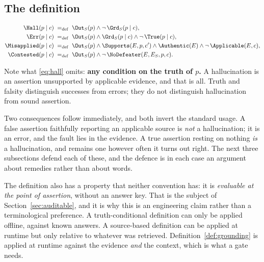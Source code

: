 \subsection{The definition}
\label{sec:hall-def}

\begin{definition}
\label{def:hallucination}
\begin{align}
  \Hall(p \mid c)       &\;=_{\mathrm{def}}\; \Out_S(p) \wedge \neg\,\Grd_S(p \mid c), \label{eq:hall}\\
  \Err(p \mid c)        &\;=_{\mathrm{def}}\; \Out_S(p) \wedge \Grd_S(p \mid c)
                           \wedge \neg\,\True(p \mid c), \label{eq:err}\\
  \Misapplied(p \mid c) &\;=_{\mathrm{def}}\; \Out_S(p) \wedge \Supports(E, p, c')
                           \wedge \Authentic(E) \wedge \neg\,\Applicable(E, c),
                           \label{eq:misapplied}\\
  \Contested(p \mid c)  &\;=_{\mathrm{def}}\; \Out_S(p) \wedge \neg\,\NoDefeater(E, E_S, p, c).
                           \label{eq:contested}
\end{align}
\end{definition}

Note what \eqref{eq:hall} omits: \textbf{any condition on the truth of $p$.} A
hallucination is an assertion unsupported by applicable evidence, and that is all.
Truth and falsity distinguish successes from errors; they do not distinguish
hallucination from sound assertion.

Two consequences follow immediately, and both invert the standard usage. A false
assertion faithfully reporting an applicable source is \emph{not} a hallucination;
it is an error, and the fault lies in the evidence. A true assertion resting on
nothing \emph{is} a hallucination, and remains one however often it turns out
right. The next three subsections defend each of these, and the defence is in each
case an argument about remedies rather than about words.

The definition also has a property that neither convention has: it is
\emph{evaluable at the point of assertion}, without an answer key. That is the
subject of Section~\ref{sec:auditable}, and it is why this is an engineering claim
rather than a terminological preference. A truth-conditional definition can only be
applied offline, against known answers. A source-based definition can be applied at
runtime but only relative to whatever was retrieved. Definition~\ref{def:grounding}
is applied at runtime against the evidence \emph{and} the context, which is what a
gate needs.

